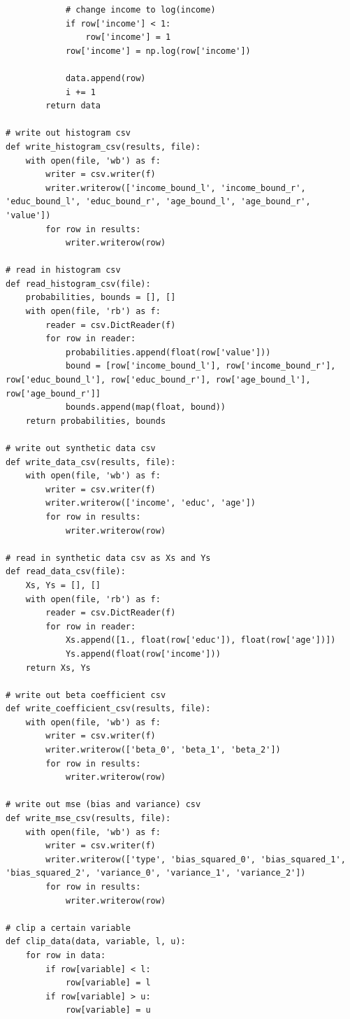 \documentclass[12pt]{article}
\begin{document}
\begin{appendices}
\begin{lstlisting}
            # change income to log(income)
            if row['income'] < 1:
                row['income'] = 1
            row['income'] = np.log(row['income'])

            data.append(row)
            i += 1
        return data

# write out histogram csv
def write_histogram_csv(results, file):
    with open(file, 'wb') as f:
        writer = csv.writer(f)
        writer.writerow(['income_bound_l', 'income_bound_r', 'educ_bound_l', 'educ_bound_r', 'age_bound_l', 'age_bound_r', 'value'])
        for row in results:
            writer.writerow(row)

# read in histogram csv
def read_histogram_csv(file):
    probabilities, bounds = [], []
    with open(file, 'rb') as f:
        reader = csv.DictReader(f)
        for row in reader:
            probabilities.append(float(row['value']))
            bound = [row['income_bound_l'], row['income_bound_r'], row['educ_bound_l'], row['educ_bound_r'], row['age_bound_l'], row['age_bound_r']]
            bounds.append(map(float, bound))
    return probabilities, bounds

# write out synthetic data csv
def write_data_csv(results, file):
    with open(file, 'wb') as f:
        writer = csv.writer(f)
        writer.writerow(['income', 'educ', 'age'])
        for row in results:
            writer.writerow(row)

# read in synthetic data csv as Xs and Ys
def read_data_csv(file):
    Xs, Ys = [], []
    with open(file, 'rb') as f:
        reader = csv.DictReader(f)
        for row in reader:
            Xs.append([1., float(row['educ']), float(row['age'])])
            Ys.append(float(row['income']))
    return Xs, Ys

# write out beta coefficient csv
def write_coefficient_csv(results, file):
    with open(file, 'wb') as f:
        writer = csv.writer(f)
        writer.writerow(['beta_0', 'beta_1', 'beta_2'])
        for row in results:
            writer.writerow(row)

# write out mse (bias and variance) csv
def write_mse_csv(results, file):
    with open(file, 'wb') as f:
        writer = csv.writer(f)
        writer.writerow(['type', 'bias_squared_0', 'bias_squared_1', 'bias_squared_2', 'variance_0', 'variance_1', 'variance_2'])
        for row in results:
            writer.writerow(row)

# clip a certain variable
def clip_data(data, variable, l, u):
    for row in data:
        if row[variable] < l:
            row[variable] = l
        if row[variable] > u:
            row[variable] = u


\end{lstlisting}
\end{appendices}
\end{document}
